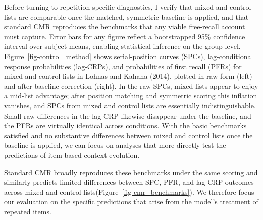 \documentclass[
  letterpaper,
  11pt,
  english,
  singlespacing,
  headsepline]{MastersDoctoralThesis}
\begin{document}
Before turning to repetition-specific diagnostics, I verify that mixed
and control lists are comparable once the matched, symmetric baseline is
applied, and that standard CMR reproduces the benchmarks that any viable
free-recall account must capture. Error bars for any figure reflect a
bootstrapped 95\% confidence interval over subject means, enabling
statistical inference on the group level.
Figure~\ref{fig-control_method} shows serial-position curves (SPCs),
lag-conditional response probabilities (lag-CRPs), and probabilities of
first recall (PFRs) for mixed and control lists in Lohnas and Kahana
(2014), plotted in raw form (left) and after baseline correction
(right). In the raw SPCs, mixed lists appear to enjoy a mid-list
advantage; after position matching and symmetric scoring this inflation
vanishes, and SPCs from mixed and control lists are essentially
indistinguishable. Small raw differences in the lag-CRP likewise
disappear under the baseline, and the PFRs are virtually identical
across conditions. With the basic benchmarks satisfied and no
substantive differences between mixed and control lists once the
baseline is applied, we can focus on analyses that more directly test
the predictions of item-based context evolution.

Standard CMR broadly reproduces these benchmarks under the same scoring
and similarly predicts limited differences between SPC, PFR, and lag-CRP
outcomes across mixed and control
lists(Figure~\ref{fig-cmr_benchmarks}). We therefore focus our
evaluation on the specific predictions that arise from the model's
treatment of repeated items.
\end{document}
